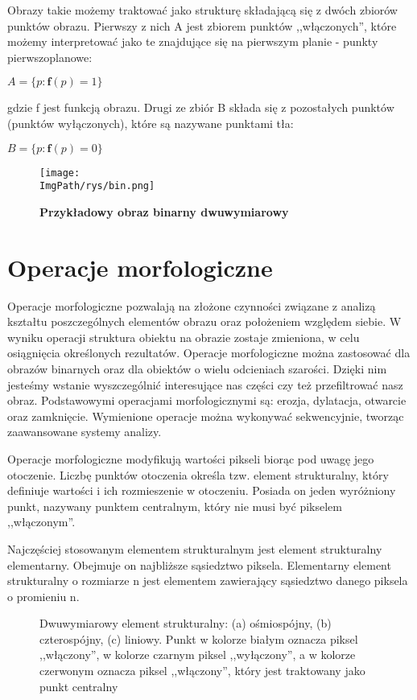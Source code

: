 \documentclass[a4paper,12pt,twoside,openany]{report}
\newcommand{\ImgPath}{.}
\begin{document}
Obrazy takie możemy traktować jako strukturę składającą się z dwóch zbiorów punktów obrazu. Pierwszy z nich A jest zbiorem punktów ,,włączonych'', które możemy interpretować jako te znajdujące się na pierwszym planie - punkty pierwszoplanowe:
\begin{center}
	$ A = \{p \colon \textbf{f}(p) = 1\} $ 
\end{center}
gdzie f jest funkcją obrazu. Drugi ze zbiór B składa się z pozostałych punktów (punktów wyłączonych), które są nazywane punktami tła:
\begin{center}
	$ B = \{p \colon \textbf{f}(p) = 0\} $ 
\end{center}

\begin{figure}[H]	
	\centering
	\texttt{[image: \\ImgPath/rys/bin.png]}
	
	\caption{  \textbf{Przykładowy obraz binarny dwuwymiarowy}}
\end{figure}

\section{Operacje morfologiczne}
Operacje morfologiczne pozwalają na złożone czynności związane z analizą kształtu poszczególnych elementów obrazu oraz położeniem względem siebie. W wyniku operacji struktura obiektu na obrazie zostaje zmieniona, w celu osiągnięcia określonych rezultatów. 
Operacje morfologiczne można zastosować dla obrazów binarnych oraz dla obiektów o wielu odcieniach szarości\cite{Malina}. Dzięki nim jesteśmy wstanie wyszczególnić interesujące nas części czy też przefiltrować nasz obraz. Podstawowymi operacjami morfologicznymi są: erozja, dylatacja, otwarcie oraz zamknięcie. Wymienione operacje można wykonywać sekwencyjnie, tworząc zaawansowane systemy analizy.

Operacje morfologiczne modyfikują wartości pikseli biorąc pod uwagę jego otoczenie. Liczbę punktów otoczenia określa tzw. element strukturalny, który definiuje wartości i ich rozmieszenie w otoczeniu. Posiada on jeden wyróżniony punkt, nazywany punktem centralnym, który nie musi być pikselem ,,włączonym''. 

Najczęściej stosowanym elementem strukturalnym jest element strukturalny elementarny. Obejmuje on najbliższe sąsiedztwo piksela. Elementarny element strukturalny  o rozmiarze n jest elementem zawierający sąsiedztwo danego piksela o promieniu n\cite{Iwanowski}. 

\begin{figure}[H]
	\centering
	\caption{Dwuwymiarowy element strukturalny: (a) ośmiospójny, (b) czterospójny, (c) liniowy. Punkt w kolorze białym oznacza piksel ,,włączony'', w kolorze czarnym piksel ,,wyłączony'', a w kolorze czerwonym oznacza piksel ,,włączony'', który jest traktowany jako punkt centralny}
\end{figure}
\end{document}
